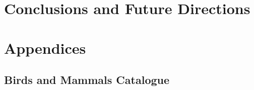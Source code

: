 \documentclass{article}
\begin{document}
	\section{Conclusions and Future Directions}\label{Conclusions}
		
		\newpage

	    
	    {}

		\newpage
	\section{Appendices}\label{Apendices}
		\subsection{Birds and Mammals Catalogue} 
		\label{AppendixBirds}
		\newpage
	
		
	
    
\end{document}
